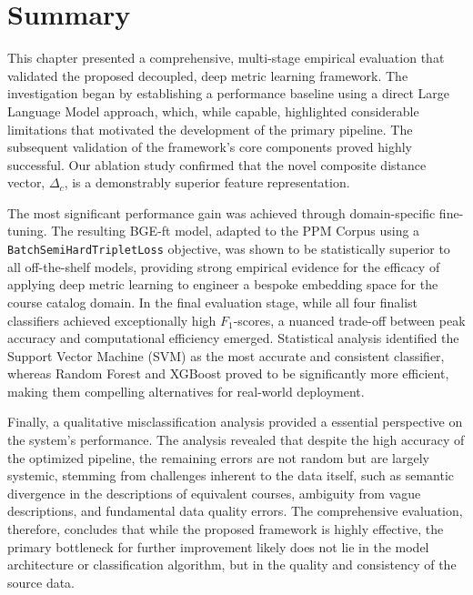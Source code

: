 \section{Summary}\label{ch:4.7}
This chapter presented a comprehensive, multi-stage empirical evaluation that validated the proposed decoupled, deep metric learning framework. The investigation began by establishing a performance baseline using a direct Large Language Model approach, which, while capable, highlighted considerable limitations that motivated the development of the primary pipeline. The subsequent validation of the framework's core components proved highly successful. Our ablation study confirmed that the novel composite distance vector, \(\Delta_c\), is a demonstrably superior feature representation.

The most significant performance gain was achieved through domain-specific fine-tuning. The resulting BGE-ft model, adapted to the PPM Corpus using a \verb|BatchSemiHardTripletLoss| objective, was shown to be statistically superior to all off-the-shelf models, providing strong empirical evidence for the efficacy of applying deep metric learning to engineer a bespoke embedding space for the course catalog domain. In the final evaluation stage, while all four finalist classifiers achieved exceptionally high \(F_1\)-scores, a nuanced trade-off between peak accuracy and computational efficiency emerged. Statistical analysis identified the Support Vector Machine (SVM) as the most accurate and consistent classifier, whereas Random Forest and XGBoost proved to be significantly more efficient, making them compelling alternatives for real-world deployment.{\setlength{\emergencystretch}{5em}\par}

Finally, a qualitative misclassification analysis provided a essential perspective on the system's performance. The analysis revealed that despite the high accuracy of the optimized pipeline, the remaining errors are not random but are largely systemic, stemming from challenges inherent to the data itself, such as semantic divergence in the descriptions of equivalent courses, ambiguity from vague descriptions, and fundamental data quality errors. The comprehensive evaluation, therefore, concludes that while the proposed framework is highly effective, the primary bottleneck for further improvement likely does not lie in the model architecture or classification algorithm, but in the quality and consistency of the source data.